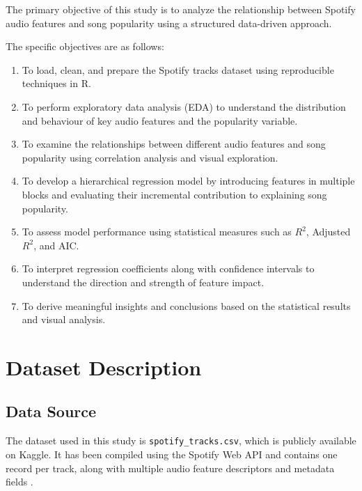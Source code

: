 \documentclass[12pt,a4paper]{article}
\begin{document}
The primary objective of this study is to analyze the relationship
between Spotify audio features and song popularity using a structured
data-driven approach.

The specific objectives are as follows:

\begin{enumerate}
  \item To load, clean, and prepare the Spotify tracks dataset using
        reproducible techniques in R.
        
  \item To perform exploratory data analysis (EDA) to understand
        the distribution and behaviour of key audio features and the
        popularity variable.
        
  \item To examine the relationships between different audio features
        and song popularity using correlation analysis and visual
        exploration.
        
  \item To develop a hierarchical regression model by introducing
        features in multiple blocks and evaluating their incremental
        contribution to explaining song popularity.
        
  \item To assess model performance using statistical measures such as
        $R^2$, Adjusted $R^2$, and AIC.
        
  \item To interpret regression coefficients along with confidence
        intervals to understand the direction and strength of
        feature impact.
        
  \item To derive meaningful insights and conclusions based on the
        statistical results and visual analysis.
\end{enumerate}
\section{Dataset Description}

\subsection{Data Source}

The dataset used in this study is \texttt{spotify\_tracks.csv}, which is
publicly available on Kaggle. It has been compiled using the Spotify Web
API and contains one record per track, along with multiple audio feature
descriptors and metadata fields \citep{kaggle_spotify}.
\end{document}
